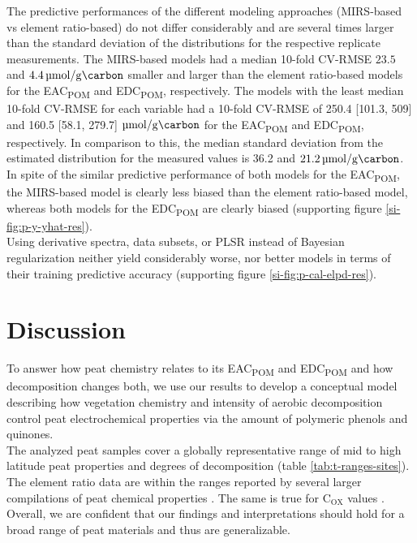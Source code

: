 \documentclass[draft,linenumbers]{agujournal2018}
\begin{document}
The predictive performances of the different modeling approaches
(MIRS-based vs element ratio-based) do not differ considerably and are
several times larger than the standard deviation of the distributions
for the respective replicate measurements. The MIRS-based models had a
median 10-fold CV-RMSE \(23.5\) and
\(\SI{4.4}{\micro\mol\per\g\carbon}\) smaller and larger than the
element ratio-based models for the EAC\textsubscript{POM} and
EDC\textsubscript{POM}, respectively. The models with the least median
10-fold CV-RMSE for each variable had a 10-fold CV-RMSE of 250.4
{[}101.3, 509{]} and 160.5 {[}58.1, 279.7{]}
\(\si{\micro\mol\per\g\carbon}\) for the EAC\textsubscript{POM} and
EDC\textsubscript{POM}, respectively. In comparison to this, the median
standard deviation from the estimated distribution for the measured
values is 36.2 and \(\SI{21.2}{\micro\mol\per\g\carbon}\). In spite of
the similar predictive performance of both models for the
EAC\textsubscript{POM}, the MIRS-based model is clearly less biased than
the element ratio-based model, whereas both models for the
EDC\textsubscript{POM} are clearly biased (supporting figure
\ref{si-fig:p-y-yhat-res}).\\
Using derivative spectra, data subsets, or PLSR instead of Bayesian
regularization neither yield considerably worse, nor better models in
terms of their training predictive accuracy (supporting figure
\ref{si-fig:p-cal-elpd-res}).

\section{Discussion}

To answer how peat chemistry relates to its EAC\textsubscript{POM} and
EDC\textsubscript{POM} and how decomposition changes both, we use our
results to develop a conceptual model describing how vegetation
chemistry and intensity of aerobic decomposition control peat
electrochemical properties via the amount of polymeric phenols and
quinones.\\
The analyzed peat samples cover a globally representative range of mid
to high latitude peat properties and degrees of decomposition (table
\ref{tab:t-ranges-sites}). The element ratio data are within the ranges
reported by several larger compilations of peat chemical properties
\citep{Moore.2018, Leifeld.2020, Wang.2015b, Loisel.2014, Tipping.2016}.
The same is true for C\(_\textrm{OX}\) values
\citep{Worrall.2016b, Moore.2018, Leifeld.2020}. Overall, we are
confident that our findings and interpretations should hold for a broad
range of peat materials and thus are generalizable.
\end{document}
